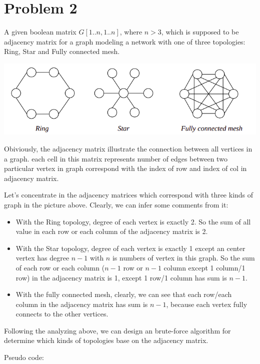 \documentclass[a4paper]{article}
\begin{document}
\section{Problem 2}
A given boolean matrix $G[1..n, 1..n]$, where $n>3$, which is supposed to be adjacency matrix for a graph modeling a network with one of three topologies: Ring, Star and Fully connected mesh.\par
\begin{center}
    \includegraphics[scale=0.6]{image/problem2.png}
\end{center}
Obiviously, the adjacency matrix illustrate the connection between all vertices in a graph. each cell in this matrix represents number of edges between two particular vertex in graph correspond with the index of row and index of col in adjacency matrix. \par
Let's concentrate in the adjacency matrices which correspond with three kinds of graph in the picture above. Clearly, we can infer some comments from it:
\begin{itemize}
    \item With the Ring topology, degree of each vertex is exactly 2. So the sum of all value in each row or each column of the adjacency matrix is 2.
    \item With the Star topology, degree of each vertex is exactly 1 except an center vertex has degree $n-1$ with $n$ is numbers of vertex in this graph. So the sum of each row or each column ($n-1$ row or $n-1$ column except 1 column/1 row) in the adjacency matrix is 1, except 1 row/1 column has sum is $n-1.$
    \item With the fully connected mesh, clearly, we can see that each row/each column in the adjacency matrix has sum is $n-1$, because each vertex fully connects to the other vertices.
\end{itemize}
Following the analyzing above, we can design an brute-force algorithm for determine which kinds of topologies base on the adjacency matrix. \par
Pseudo code: \par
\end{document}
